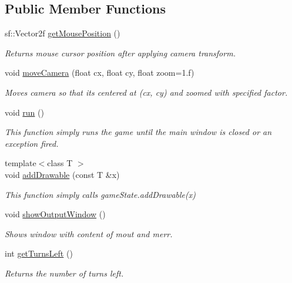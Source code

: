 \subsection*{Public Member Functions}
\begin{DoxyCompactItemize}
\item 
sf\+::\+Vector2f \hyperlink{classGame_a34b9f33fe8fb922224b95e50795629c2}{get\+Mouse\+Position} ()\hypertarget{classGame_a34b9f33fe8fb922224b95e50795629c2}{}\label{classGame_a34b9f33fe8fb922224b95e50795629c2}

\begin{DoxyCompactList}\small\item\em Returns mouse cursor position after applying camera transform. \end{DoxyCompactList}\item 
void \hyperlink{classGame_a401542d59b5346cba650367e548626ce}{move\+Camera} (float cx, float cy, float zoom=1.f)
\begin{DoxyCompactList}\small\item\em Moves camera so that its centered at (cx, cy) and zoomed with specified factor. \end{DoxyCompactList}\item 
void \hyperlink{classGame_a1ab78f5ed0d5ea879157357cf2fb2afa}{run} ()
\begin{DoxyCompactList}\small\item\em This function simply runs the game until the main window is closed or an exception fired. \end{DoxyCompactList}\item 
{\footnotesize template$<$class T $>$ }\\void \hyperlink{classGame_a17b8b67b1ebc97d05b97925bfe53b61f}{add\+Drawable} (const T \&x)\hypertarget{classGame_a17b8b67b1ebc97d05b97925bfe53b61f}{}\label{classGame_a17b8b67b1ebc97d05b97925bfe53b61f}

\begin{DoxyCompactList}\small\item\em This function simply calls game\+State.\+add\+Drawable(x) \end{DoxyCompactList}\item 
void \hyperlink{classGame_a52ebfe7608394f1281efb3032d059967}{show\+Output\+Window} ()\hypertarget{classGame_a52ebfe7608394f1281efb3032d059967}{}\label{classGame_a52ebfe7608394f1281efb3032d059967}

\begin{DoxyCompactList}\small\item\em Shows window with content of mout and merr. \end{DoxyCompactList}\item 
int \hyperlink{classGame_a86c625ebc5fedb4072d007ed42d89671}{get\+Turns\+Left} ()\hypertarget{classGame_a86c625ebc5fedb4072d007ed42d89671}{}\label{classGame_a86c625ebc5fedb4072d007ed42d89671}

\begin{DoxyCompactList}\small\item\em Returns the number of turns left. \end{DoxyCompactList}\end{DoxyCompactItemize}
